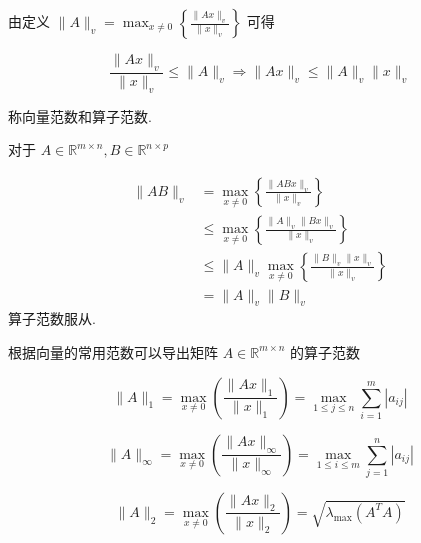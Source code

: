 由定义 $ \|A\|_{v}=\max _{x \neq 0}\left\{\frac{\|A x\|_{v}}{\|x\|_{v}}\right\} $ 可得

\begin{definition}[向量范数和算子范数相容]
    $$ \frac{\|A x\|_{v}}{\|x\|_{v}} \leq\|A\|_{v} \Rightarrow\|A x\|_{v} \leq\|A\|_{v}\|x\|_{v} $$

    称向量范数和算子范数. 
\end{definition}

\begin{theorem}[算子范数服从乘法范数相容性]
   对于 $ A \in \mathbb{R}^{m \times n}, B \in \mathbb{R}^{n \times p} $

    $$\begin{aligned}
        \|A B\|_{v} &=\max _{x \neq 0}\left\{\frac{\|A B x\|_{v}}{\|x\|_{v}}\right\} \\
        & \leq \max _{x \neq 0}\left\{\frac{\|A\|_{v}\|B x\|_{v}}{\|x\|_{v}}\right\} \\
        & \leq\|A\|_{v} \max _{x \neq 0}\left\{\frac{\|B\|_{v}\|x\|_{v}}{\|x\|_{v}}\right\} \\
        & =\|A\|_{v}\|B\|_{v}
    \end{aligned}$$
    算子范数服从.
\end{theorem}

根据向量的常用范数可以导出矩阵 $ A \in \mathbb{R}^{m \times n} $ 的算子范数

\begin{definition}[$A$的列范数]
    $$ \|A\|_{1}=\max _{x \neq 0}\left(\frac{\|A x\|_{1}}{\|x\|_{1}}\right)=\max _{1 \leq j \leq n} \sum_{i=1}^{m}\left|a_{i j}\right| $$
\end{definition}

\begin{definition}[$A$的行范数]
    $$ \|A\|_{\infty}=\max _{x \neq 0}\left( \frac{\|A x\|_{\infty}}{\|x\|_{\infty}}    \right)=\max _{1 \leq i \leq m} \sum_{j=1}^{n}\left|a_{i j}\right| $$
\end{definition}

\begin{definition}[$A$的2-范数]
    \begin{equation}
        \label{eqn:a-l2-norm}
        \|A\|_{2}=\max _{x \neq 0}\left( \frac{\|A x\|_{2}}{\|x\|_{2}}  \right)=\sqrt{\lambda_{\max }\left(A^{T} A\right)}
    \end{equation}
    $$  $$
\end{definition}

